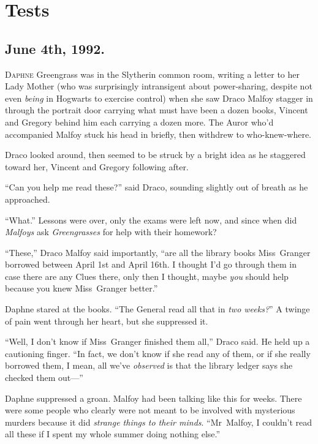 \chapter{Tests}

\section{June 4th, 1992.}

\lettrine{D}{aphne} Greengrass was in the Slytherin common room, writing a letter to her Lady Mother (who was surprisingly intransigent about power-sharing, despite not even \emph{being} in Hogwarts to exercise control) when she saw Draco Malfoy stagger in through the portrait door carrying what must have been a dozen books, Vincent and Gregory behind him each carrying a dozen more. The Auror who’d accompanied Malfoy stuck his head in briefly, then withdrew to who-knew-where.

Draco looked around, then seemed to be struck by a bright idea as he staggered toward her, Vincent and Gregory following after.

“Can you help me read these?” said Draco, sounding slightly out of breath as he approached.

“What.” Lessons were over, only the exams were left now, and since when did \emph{Malfoys} ask \emph{Greengrasses} for help with their homework?

“These,” Draco Malfoy said importantly, “are all the library books Miss~Granger borrowed between April 1st and April 16th. I thought I’d go through them in case there are any Clues there, only then I thought, maybe \emph{you} should help because you knew Miss~Granger better.”

Daphne stared at the books. “The General read all that in \emph{two weeks?}” A twinge of pain went through her heart, but she suppressed it.

“Well, I don’t know if Miss~Granger finished them all,” Draco said. He held up a cautioning finger. “In fact, we don’t know if she read any of them, or if she really borrowed them, I mean, all we’ve \emph{observed} is that the library ledger says she checked them out—”

Daphne suppressed a groan. Malfoy had been talking like this for weeks. There were some people who clearly were not meant to be involved with mysterious murders because it did \emph{strange things to their minds}. “Mr~Malfoy, I couldn’t read all these if I spent my whole summer doing nothing else.”

